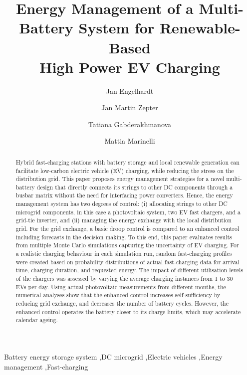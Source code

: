 \documentclass[final,5p,times,twocolumn]{elsarticle}
\begin{document}
\begin{frontmatter}


\title{Energy Management of a Multi-Battery System for Renewable-Based\\High Power EV Charging}


\author{Jan Engelhardt}
\author{Jan Martin Zepter}
\author{Tatiana Gabderakhmanova}
\author{Mattia Marinelli}

\address{Department of Wind and Energy Systems\\Technical University of Denmark (DTU)\\Frederiksborgvej 399, 4000 Roskilde}


\begin{abstract}
Hybrid fast-charging stations with battery storage and local renewable generation can facilitate low-carbon electric vehicle (EV) charging, while reducing the stress on the distribution grid. This paper proposes energy management strategies for a novel multi-battery design that directly connects its strings to other DC components through a busbar matrix without the need for interfacing power converters. Hence, the energy management system has two degrees of control: (i) allocating strings to other DC microgrid components, in this case a photovoltaic system, two EV fast chargers, and a grid-tie inverter, and (ii) managing the energy exchange with the local distribution grid. For the grid exchange, a basic droop control is compared to an enhanced control including forecasts in the decision making. To this end, this paper evaluates results from multiple Monte Carlo simulations capturing the uncertainty of EV charging. For a realistic charging behaviour in each simulation run, random fast-charging profiles were created based on probability distributions of actual fast-charging data for arrival time, charging duration, and requested energy. The impact of different utilisation levels of the chargers was assessed by varying the average charging instances from 1 to 30 EVs per day. Using actual photovoltaic measurements from different months, the numerical analyses show that the enhanced control increases self-sufficiency by reducing grid exchange, and decreases the number of battery cycles. However, the enhanced control operates the battery closer to its charge limits, which may accelerate calendar ageing. 
\end{abstract}


\begin{keyword}
Battery energy storage system \sep DC microgrid \sep Electric vehicles \sep Energy management \sep Fast-charging
\end{keyword}

\end{frontmatter}
\end{document}
